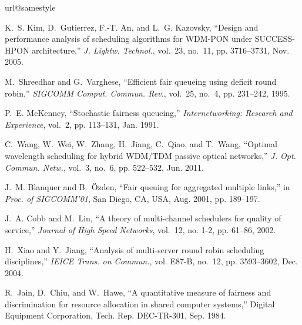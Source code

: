 \documentclass[conference,letterpaper]{IEEEtran}
\begin{document}
\begin{thebibliography}{1}
\providecommand{\url}[1]{#1}
\csname url@samestyle\endcsname
\providecommand{\newblock}{\relax}
\providecommand{\bibinfo}[2]{#2}
\providecommand{\BIBentrySTDinterwordspacing}{\spaceskip=0pt\relax}
\providecommand{\BIBentryALTinterwordstretchfactor}{4}
\providecommand{\BIBentryALTinterwordspacing}{\spaceskip=\fontdimen2\font plus
\BIBentryALTinterwordstretchfactor\fontdimen3\font minus
  \fontdimen4\font\relax}
\providecommand{\BIBforeignlanguage}[2]{{\expandafter\ifx\csname l@#1\endcsname\relax
\typeout{** WARNING: IEEEtran.bst: No hyphenation pattern has been}\typeout{** loaded for the language `#1'. Using the pattern for}\typeout{** the default language instead.}\else
\language=\csname l@#1\endcsname
\fi
#2}}
\providecommand{\BIBdecl}{\relax}
\BIBdecl

K.~S. Kim, D.~Gutierrez, F.-T. An, and L.~G. Kazovsky, ``Design and performance
  analysis of scheduling algorithms for {WDM-PON} under {SUCCESS-HPON}
  architecture,'' \emph{J. Lightw. Technol.}, vol.~23, no.~11, pp. 3716--3731,
  Nov. 2005.

M.~Shreedhar and G.~Varghese, ``Efficient fair queueing using deficit round
  robin,'' \emph{SIGCOMM Comput. Commun. Rev.}, vol.~25, no.~4, pp. 231--242,
  1995.

P.~E. McKenney, ``Stochastic fairness queueing,'' \emph{Internetworking:
  Research and Experience}, vol.~2, pp. 113--131, Jan. 1991.

C.~Wang, W.~Wei, W.~Zhang, H.~Jiang, C.~Qiao, and T.~Wang, ``Optimal wavelength
  scheduling for hybrid {WDM/TDM} passive optical networks,'' \emph{J. Opt.
  Commun. Netw.}, vol.~3, no.~6, pp. 522--532, Jun. 2011.

J.~M. Blanquer and B.~\"{O}zden, ``Fair queuing for aggregated multiple
  links,'' in \emph{Proc. of {SIGCOMM'01}}, San Diego, {CA}, {USA}, Aug. 2001,
  pp. 189--197.

J.~A. Cobb and M.~Lin, ``A theory of multi-channel schedulers for quality of
  service,'' \emph{Journal of High Speed Networks}, vol.~12, no. 1-2, pp.
  61--86, 2002.

H.~Xiao and Y.~Jiang, ``Analysis of multi-server round robin scheduling
  disciplines,'' \emph{{IEICE} Trans. on Commun.}, vol. {E87-B}, no.~12, pp.
  3593--3602, Dec. 2004.

R.~Jain, D.~Chiu, and W.~Hawe, ``A quantitative measure of fairness and
  discrimination for resource allocation in shared computer systems,'' Digital
  Equipment Corporation, Tech. Rep. DEC-TR-301, Sep. 1984.
\end{thebibliography}
\end{document}
